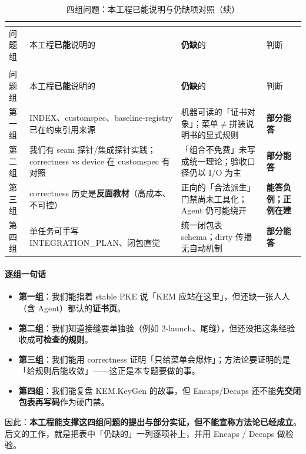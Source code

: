 \documentclass[UTF8,a4paper,11pt]{ctexart}
\theoremstyle{definition}
\theoremstyle{plain}
\theoremstyle{remark}
\numberwithin{figure}{section}
\numberwithin{table}{section}
\begin{document}
{\small
\begin{longtable}{@{}L{2.4cm}L{4.2cm}L{4.8cm}L{3.2cm}@{}}
  \caption{四组问题：本工程已能说明与仍缺项对照}\\
  \label{tab:ch2-four-q}\\
  \toprule
  问题组 & 本工程\textbf{已能}说明的 & \textbf{仍缺}的 & 判断 \\
  \midrule
  \endfirsthead
  \caption[]{四组问题：本工程已能说明与仍缺项对照（续）}\\
  \toprule
  问题组 & 本工程\textbf{已能}说明的 & \textbf{仍缺}的 & 判断 \\
  \midrule
  \endhead
  第一组 &
  INDEX、customspec、baseline-registry 已在约束引用来源 &
  机器可读的「证书对象」；菜单$\neq$拼装说明书的显式规则 &
  \textbf{部分能答} \\
  \midrule
  第二组 &
  我们有 seam 探针/集成探针实践；correctness vs device 在 customspec 有对照 &
  「组合不免费」未写成统一理论；验收口径仍以 I/O 为主 &
  \textbf{部分能答} \\
  \midrule
  第三组 &
  correctness 历史是\textbf{反面教材}（高成本、不可控） &
  正向的「合法派生」门禁尚未工具化；Agent 仍可能绕开 &
  \textbf{能答负例；正例在建} \\
  \midrule
  第四组 &
  单任务可手写 INTEGRATION\_PLAN、闭包直觉 &
  统一闭包表 schema；dirty 传播无自动机制 &
  \textbf{部分能答} \\
  \bottomrule
\end{longtable}
}

\paragraph{逐组一句话}
\begin{itemize}
  \item \textbf{第一组}：我们能指着 stable PKE 说「KEM 应站在这里」，但还缺一张人人（含 Agent）都认的\textbf{证书页}。
  \item \textbf{第二组}：我们知道接缝要单独验（例如 2-launch、尾缝），但还没把这条经验收成\textbf{可检查的规则}。
  \item \textbf{第三组}：我们能用 correctness 证明「只给菜单会爆炸」；方法论要证明的是「给规则后能收敛」——这正是本专题要做的事。
  \item \textbf{第四组}：我们能复盘 KEM.KeyGen 的故事，但 Encaps/Decaps 还不能\textbf{先交闭包表再写码}作为硬门禁。
\end{itemize}

因此：\textbf{本工程能支撑这四组问题的提出与部分实证，但不能宣称方法论已经成立}。
后文的工作，就是把表中「仍缺的」一列逐项补上，并用 Encaps / Decaps 做检验。
\end{document}
